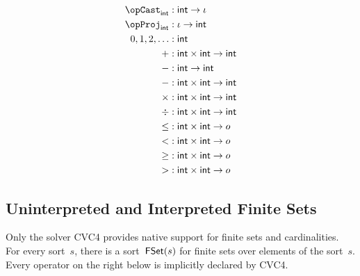 \documentclass[11pt, a4paper, oneside]{article}
\begin{document}
\begin{align*}
    \opCast_\int    &: \int \arr \idv \\
    \opProj_\int    &: \idv \arr \int \\
    0,1,2,\dots     &: \int \\
    +               &: \int \times \int \arr \int \\
    -               &: \int \arr \int \\
    -               &: \int \times \int \arr \int \\
    \times          &: \int \times \int \arr \int \\
    \div            &: \int \times \int \arr \int \\
    \le             &: \int \times \int \arr o \\
    <               &: \int \times \int \arr o \\
    \ge             &: \int \times \int \arr o \\
    >               &: \int \times \int \arr o \\
\end{align*}


    \subsection{Uninterpreted and Interpreted Finite Sets}

Only the solver CVC4 provides native support for finite sets and cardinalities.  For every sort~$s$, there is a sort~$\mathsf{FSet}(s)$ for finite sets over elements of the sort~$s$.  Every operator on the right below is implicitly declared by CVC4.
\end{document}
